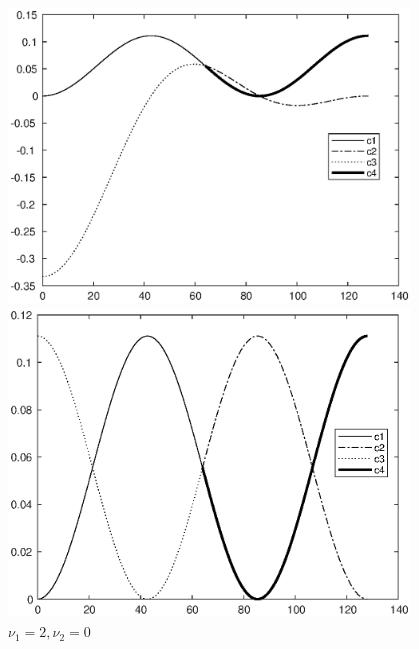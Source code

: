 \documentclass[twoside,a4paper]{article}
\begin{document}
\begin{figure}[H]
    \begin{minipage}[t]{0.32\textwidth}
        \centering
        \includegraphics[width=0.95\textwidth]{figure/ex9_41_11_128.eps}
        \caption*{$\nu_1=1,\nu_2=1$}
    \end{minipage}
    \begin{minipage}[t]{0.32\textwidth}
        \centering
        \includegraphics[width=0.95\textwidth]{figure/ex9_41_20_128.eps}
        \caption*{$\nu_1=2,\nu_2=0$}
    \end{minipage}
    \begin{minipage}[t]{0.32\textwidth}
        \centering

\end{minipage}
\end{figure}
\end{document}
